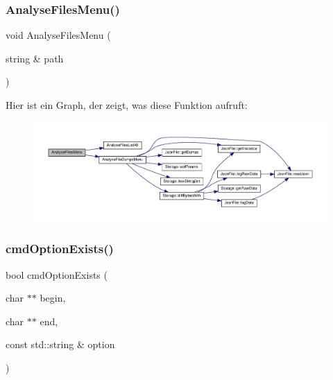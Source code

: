\mbox{\label{_jura_coffee_memory_8cpp_a755b1b20dcd140974d1760d5d19efbae}} 
\subsubsection{Analyse\+Files\+Menu()}
{\footnotesize\ttfamily void Analyse\+Files\+Menu (\begin{DoxyParamCaption}\item[{string \&}]{path }\end{DoxyParamCaption})}

Hier ist ein Graph, der zeigt, was diese Funktion aufruft\+:
\nopagebreak
\begin{figure}[H]
\begin{center}
\leavevmode
\includegraphics[width=350pt]{_jura_coffee_memory_8cpp_a755b1b20dcd140974d1760d5d19efbae_cgraph}
\end{center}
\end{figure}
\mbox{\label{_jura_coffee_memory_8cpp_a3e17e291195c7153863766f9374c14ab}} 
\subsubsection{cmd\+Option\+Exists()}
{\footnotesize\ttfamily bool cmd\+Option\+Exists (\begin{DoxyParamCaption}\item[{char $\ast$$\ast$}]{begin,  }\item[{char $\ast$$\ast$}]{end,  }\item[{const std\+::string \&}]{option }\end{DoxyParamCaption})}

\mbox{\label{_jura_coffee_memory_8cpp_a9801ee1f612b606462a61b77cef5ac94}} 
